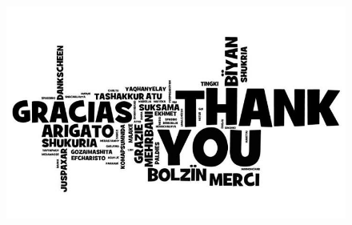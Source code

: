 \documentclass[10pt]{beamer}
\begin{document}
\begin{frame}{}{}
\begin{block}{}

\begin{figure}[!h]
\begin{center}
\includegraphics[width=.8\textwidth]{./AAUgraphics/gracias.jpg}
\end{center}
\end{figure}

\end{block}
\end{frame}




%
%
%
\end{document}

